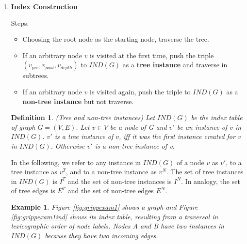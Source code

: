\documentclass[11pt]{article}
\newtheorem{example}[theorem]{Example}
\newtheorem{definition}[theorem]{Definition}
\begin{document}
\begin{enumerate}
	\item \textbf{Index Construction}
	
	Steps:
	\begin{itemize}
		\item Choosing the root node as the starting node, traverse the tree.
		\item If an arbitrary node $v$ is visited at the first time, push the triple $(v_{pre}, v_{post}, v_{depth})$ to $IND(G)$ as a \textbf{tree instance} and traverse in subtrees.
		\item If an arbitrary node $v$ is visited again, push the triple to $IND(G)$ as a \textbf{non-tree instance} but not traverse.
	\end{itemize} 
	
	\begin{definition}{(Tree and non-tree instances)} 
	Let $IND(G)$ be the index table of graph $G=(V,E)$. Let $v\in V$ be a node of G and $v'$ be an instance of $v$ in $IND(G)$. $v'$ is a tree instance of $v$, iff it was the first instance created for $v$ in $IND(G)$. Otherwise $v'$ is a non-tree instance of v.
	\end{definition}
 	In the following, we refer to any instance in $IND(G)$ of a node $v$ as $v'$, to a tree instance as $v^T$, and to a non-tree instance as $v^N$. The set of tree instances in $IND(G)$ is $I^T$ and the set of non-tree instances is $I^N$. In analogy, the set of tree edges is $E^T$ and the set of non-tree edges $E^N$.
	
	\begin{example}
		Figure \ref{fig:grippexam1} shows a graph and Figure \ref{fig:grippexam1ind} shows its index table, resulting from a traversal in lexicographic order of node labels. Nodes A and B have two instances in $IND(G)$ because they have two incoming edges.
	\end{example}
	

\end{enumerate}
\end{document}
